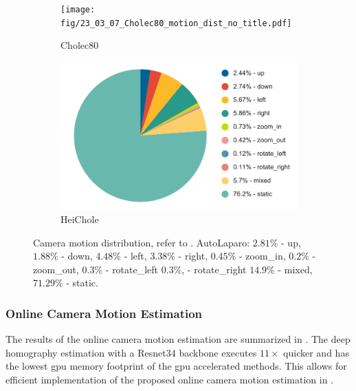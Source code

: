 \begin{figure}[htb]
    \centering
    \begin{subfigure}[b]{0.49\textwidth}
        \centering
        \texttt{[image: fig/23\_03\_07\_Cholec80\_motion\_dist\_no\_title.pdf]}
        \caption{Cholec80}
    \end{subfigure}
    \hfill
    \centering
    \begin{subfigure}[b]{0.49\textwidth}
        \centering
        \includegraphics[width=\textwidth]{fig/23_03_07_HeiChole_motion_dist_no_title.pdf}
        \caption{HeiChole}
    \end{subfigure}
    \caption{Camera motion distribution, refer to . AutoLaparo: $2.81\%$ - up, $1.88\%$ - down, $4.48\%$ - left, $3.38\%$ - right, $0.45\%$ - zoom\_in, $0.2\%$ - zoom\_out, $0.3\%$ - rotate\_left $0.3\%$, - rotate\_right $14.9\%$ - mixed, $71.29\%$ - static.}
    \label{c4:fig:camera_motion_distribution}
\end{figure}

\subsubsection{Online Camera Motion Estimation}
The results of the online camera motion estimation are summarized in . The deep homography estimation with a Resnet34 backbone executes $11\times$ quicker and has the lowest \gls{gpu} memory footprint of the \gls{gpu} accelerated methods. This allows for efficient implementation of the proposed online camera motion estimation in .

